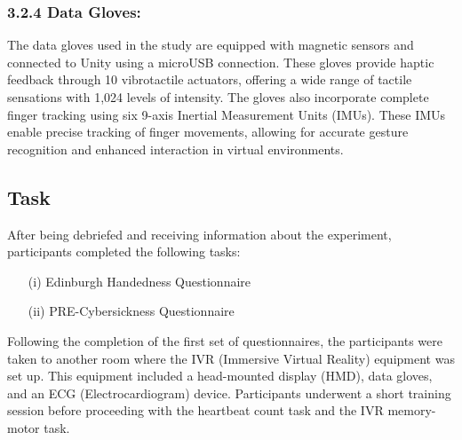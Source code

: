 \documentclass[12pt,oneside,openright]{report}
\begin{document}
\subsubsection*{3.2.4 Data Gloves:}
The data gloves used in the study are equipped with magnetic sensors and connected to Unity using a microUSB connection. These gloves provide haptic feedback through 10 vibrotactile actuators, offering a wide range of tactile sensations with 1,024 levels of intensity. The gloves also incorporate complete finger tracking using six 9-axis Inertial Measurement Units (IMUs). These IMUs enable precise tracking of finger movements, allowing for accurate gesture recognition and enhanced interaction in virtual environments.
    \subsection*{Task}
    After being debriefed and receiving information about the experiment, participants completed the following tasks:
\begin{enumerate}
\item[(i)] Edinburgh Handedness Questionnaire
\item[(ii)] PRE-Cybersickness Questionnaire
\end{enumerate}

Following the completion of the first set of questionnaires, the participants were taken to another room where the IVR (Immersive Virtual Reality) equipment was set up. This equipment included a head-mounted display (HMD), data gloves, and an ECG (Electrocardiogram) device. Participants underwent a short training session before proceeding with the heartbeat count task and the IVR memory-motor task.
\end{document}
